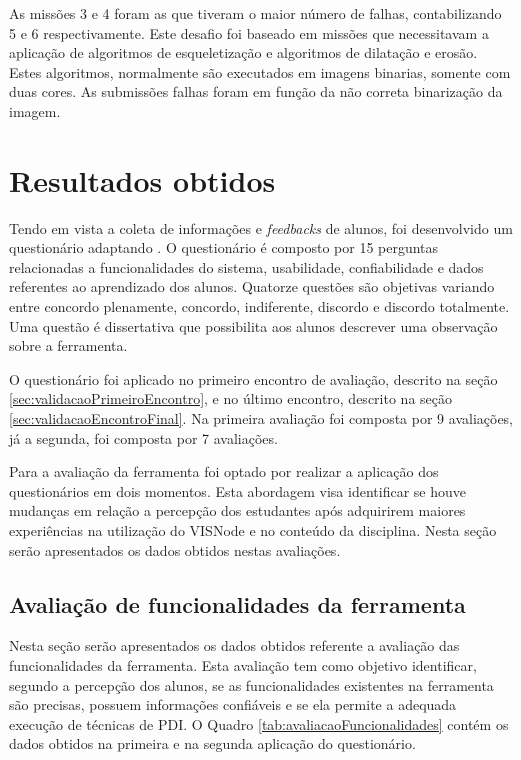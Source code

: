 \documentclass[
	12pt,				%
	oneside,			%
	a4paper,			%
	english,			%
	french,				%
	spanish,			%
	brazil,				%
	]{abntex2}
\begin{document}
As missões 3 e 4 foram as que tiveram o maior número de falhas, contabilizando 5 e 6 respectivamente. Este desafio foi baseado em missões que necessitavam a aplicação de algoritmos de esqueletização e algoritmos de dilatação e erosão. Estes algoritmos, normalmente são executados em imagens binarias, somente com duas cores. As submissões falhas foram em função da não correta binarização da imagem.

\section{Resultados obtidos}
\label{sec:resultadosObtidos}

Tendo em vista a coleta de informações e \textit{feedbacks} de alunos, foi desenvolvido um questionário adaptando \citet{bez2013}. O questionário é composto por 15 perguntas relacionadas a funcionalidades do sistema, usabilidade, confiabilidade e dados referentes ao aprendizado dos alunos. Quatorze questões são objetivas variando entre concordo plenamente, concordo, indiferente, discordo e discordo totalmente. Uma questão é dissertativa que possibilita aos alunos descrever uma observação sobre a ferramenta.

O questionário foi aplicado no primeiro encontro de avaliação, descrito na seção \ref{sec:validacaoPrimeiroEncontro}, e no último encontro, descrito na seção \ref{sec:validacaoEncontroFinal}. Na primeira avaliação foi composta por 9 avaliações, já a segunda, foi composta por 7 avaliações.

Para a avaliação da ferramenta foi optado por realizar a aplicação dos questionários em dois momentos. Esta abordagem visa identificar se houve mudanças em relação a percepção dos estudantes após   adquirirem maiores experiências na utilização do VISNode e no conteúdo da disciplina. Nesta seção serão apresentados os dados obtidos nestas avaliações.

\subsection{Avaliação de funcionalidades da ferramenta}

Nesta seção serão apresentados os dados obtidos referente a avaliação das funcionalidades da ferramenta. Esta avaliação tem como objetivo identificar, segundo a percepção dos alunos, se as funcionalidades existentes na ferramenta são precisas, possuem informações confiáveis e se ela permite a adequada execução de técnicas de PDI. O Quadro \ref{tab:avaliacaoFuncionalidades} contém os dados obtidos na primeira e na segunda aplicação do questionário. 
\end{document}
